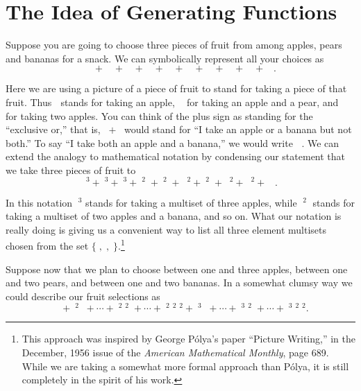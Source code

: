 \documentclass[10pt,]{book}
\theoremstyle{plain}
\theoremstyle{definition}
\numberwithin{equation}{chapter}
\newcommand{\apple}{\text{🍎}}
\newcommand{\ap}{\apple}
\newcommand{\banana}{\text{🍌}}
\newcommand{\ba}{\banana}
\newcommand{\pear}{\text{🍐}}
\newcommand{\pe}{\pear}
\begin{document}
\section[{The Idea of Generating Functions}]{The Idea of Generating Functions}\label{sec_genfns-idea}
Suppose you are going to choose three pieces of fruit from among apples, pears and bananas for a snack.  We can symbolically represent all your choices as%
\begin{equation*}
\ap\ap\ap+\pe\pe\pe+\ba\ba\ba+\ap\ap\pe+\ap\ap\ba+\ap\pe\pe +\pe\pe\ba
+\ap\ba\ba+\pe\ba\ba+\ap\pe\ba.
\end{equation*}
%
\par
Here we are using a picture of a piece of fruit to stand for taking a piece of that fruit. Thus \(\ap\) stands for taking an apple, \(\ap\pe\) for taking an apple and a pear, and \(\ap\ap\) for taking two apples.  You can think of the plus sign as standing for the ``exclusive or,'' that is, \(\ap+\ba\) would stand for ``I take an apple or a banana but not both.'' To say ``I take both an apple and a banana,'' we would write \(\ap\ba\). We can extend the analogy to mathematical notation by condensing our statement that we take three pieces of fruit to%
\begin{equation*}
\ap^3+\pe^3+\ba^3+\ap^2\pe+\ap^2\ba +\ap\pe^2+\pe^2\ba+
\ap\ba^2+\pe\ba^2 +\ap\pe\ba.
\end{equation*}
%
\par
In this notation \(\ap^3\) stands for taking a multiset of three apples, while \(\ap^2\ba\) stands for taking a multiset of two apples and a banana, and so on. What our notation is really doing is giving us a convenient way to list all three element multisets chosen from the set \(\{\ap,\pe,\ba\}\).\footnote{This approach was inspired by George Pólya's paper ``Picture Writing,'' in the December, 1956 issue of the \emph{American Mathematical Monthly}, page 689. While we are taking a somewhat more formal approach than Pólya, it is still completely in the spirit of his work.\label{fn-9}}%
\par
Suppose now that we plan to choose between one and three apples, between one and two pears, and between one and two bananas. In a somewhat clumsy way we could describe our fruit selections as%
\begin{equation}
\ap\pe\ba+\ap^2\pe\ba+\cdots+\ap^2\pe^2\ba+\cdots +
\ap^2\pe^2\ba^2+\ap^3\pe\ba+
\cdots +\ap^3\pe^2\ba+\cdots +
\ap^3\pe^2\ba^2.\label{uptothreefruits}
\end{equation}
%
\end{document}
